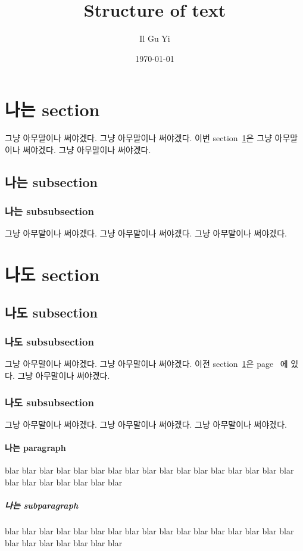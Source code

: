 \documentclass[a4paper,11pt]{article}
\author{Il Gu Yi}
\title{Structure of text}
\date{\today}
\begin{document}
\maketitle

\tableofcontents

\newpage
\section{나는 section}
\label{sec:this}
그냥 아무말이나 써야겠다.
그냥 아무말이나 써야겠다.
이번 section~\ref{sec:this}은 그냥 아무말이나 써야겠다.
그냥 아무말이나 써야겠다.


\subsection{나는 subsection}
\subsubsection{나는 subsubsection}
그냥 아무말이나 써야겠다.
그냥 아무말이나 써야겠다.
그냥 아무말이나 써야겠다.


\newpage
\section{나도 section}
\subsection{나도 subsection}
\subsubsection{나도 subsubsection}
그냥 아무말이나 써야겠다.
그냥 아무말이나 써야겠다.
이전 section~\ref{sec:this}은 page~\pageref{sec:this} 에 있다.
그냥 아무말이나 써야겠다.

\subsubsection*{나도 subsubsection}
그냥 아무말이나 써야겠다.
그냥 아무말이나 써야겠다.
그냥 아무말이나 써야겠다.


\paragraph{나는 paragraph}
blar blar blar blar blar blar blar blar
blar blar blar blar blar blar blar blar
blar blar blar blar blar blar blar blar

\subparagraph{나는 subparagraph}
blar blar blar blar blar blar blar blar
blar blar blar blar blar blar blar blar
blar blar blar blar blar blar blar blar
\end{document}
